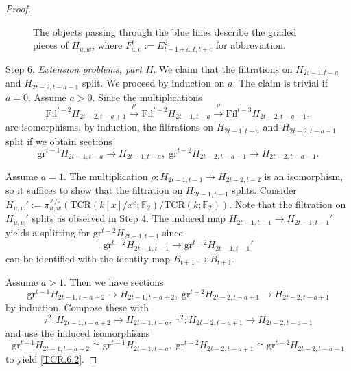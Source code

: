 \documentclass[10pt]{amsart}
\theoremstyle{definition}
\numberwithin{equation}{section}
\newcommand{\F}{\mathbb{F}}
\newcommand{\Z}{\mathbb{Z}}
\newcommand{\gr}{\mathrm{gr}}
\newcommand{\Fil}{\mathrm{Fil}}
\newcommand{\TCR}{\mathrm{TCR}}
\begin{document}
{\begin{proof}
\begin{figure}
\caption{\label{figure2}
The objects passing through the blue lines describe the graded pieces of $H_{u,w}$,
where $F_{a,c}^{t}:=E_{t-1+a,t,t+c}^2$ for abbreviation.
}
\end{figure}



Step 6. \emph{Extension problems, part II.}
We claim that the filtrations on $H_{2t-1,t-a}$ and $H_{2t-2,t-a-1}$ split.
We proceed by induction on $a$.
The claim is trivial if $a=0$.
Assume $a>0$.
Since the multiplications
\[
\Fil^{t-2} H_{2t-2,t-a+1}
\xrightarrow{\rho}
\Fil^{t-2} H_{2t-1,t-a}
\xrightarrow{\rho}
\Fil^{t-3} H_{2t-2,t-a-1},
\]
are isomorphisms,
by induction,
the filtrations on $H_{2t-1,t-a}$ and $H_{2t-2,t-a-1}$ split if we obtain sections
\begin{equation}
\label{TCR.6.2}
\gr^{t-1} H_{2t-1,t-a}\to H_{2t-1,t-a},
\;
\gr^{t-2} H_{2t-2,t-a-1}\to H_{2t-2,t-a-1}.
\end{equation}


Assume $a=1$.
The multiplication $\rho\colon H_{2t-1,t-1}\to H_{2t-2,t-2}$ is an isomorphism,
so it suffices to show that the filtration on $H_{2t-1,t-1}$ splits.
Consider
\(
H_{u,w}':=\pi_{u,w}^{\Z/2}(\TCR(k[x]/x^e;\F_2)/\TCR(k;\F_2)).
\)
Note that the filtration on $H_{u,w}'$ splits as observed in Step 4.
The induced map $H_{2t-1,t-1}\to H_{2t-1,t-1}'$ yields a splitting for $\gr^{t-2}H_{2t-1,t-1}$ since
\[
\gr^{t-2}H_{2t-1,t-1}
\to
\gr^{t-2}H_{2t-1,t-1}'
\]
can be identified with the identity map $B_{t+1}\to B_{t+1}$.


Assume $a>1$.
Then we have sections
\[
\gr^{t-1}H_{2t-1,t-a+2}\to H_{2t-1,t-a+2},
\;
\gr^{t-2}H_{2t-2,t-a+1}\to H_{2t-2,t-a+1}
\]
by induction.
Compose these with
\[
\tau^2\colon H_{2t-1,t-a+2}\to H_{2t-1,t-a},
\;
\tau^2\colon H_{2t-2,t-a+1}\to H_{2t-2,t-a-1}
\]
and use the induced isomorphisms
\[
\gr^{t-1} H_{2t-1,t-a+2}\cong \gr^{t-1} H_{2t-1,t-a},
\;
\gr^{t-2} H_{2t-2,t-a+1}\cong \gr^{t-2} H_{2t-2,t-a-1}
\]
to yield \eqref{TCR.6.2}.


\end{proof}}
\end{document}
